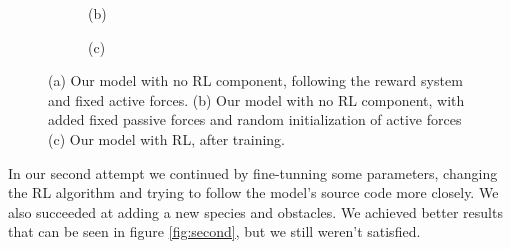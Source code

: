 \documentclass[9pt]{pnas-new}
\begin{document}
\begin{figure}[ht]
\begin{subfigure}{0.30\textwidth}
		\vspace{0.5em}
		\centering (b)
	\end{subfigure}
	\hfill
	\begin{subfigure}{0.30\textwidth}
		\centering
		\vspace{0.5em}
		\centering (c)
	\end{subfigure}
	
	\caption{(a) Our model with no RL component, following the reward system and fixed active forces. (b) Our model with no RL component, with added fixed passive forces and random initialization of active forces (c) Our model with RL, after training.}
	\label{fig:three_images}
\end{figure}

In our second attempt we continued by fine-tunning some parameters, changing the RL algorithm and trying to follow the model's source code more closely. We also succeeded at adding a new species and obstacles. We achieved better results that can be seen in figure \ref{fig:second}, but we still weren't satisfied.
\end{document}
